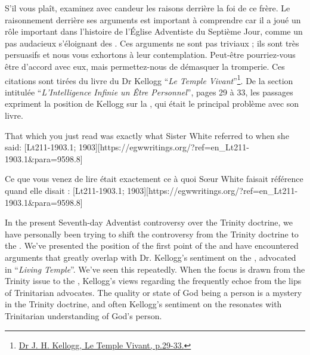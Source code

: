 S'il vous plaît, examinez avec candeur les raisons derrière la foi de ce frère. Le raisonnement derrière ses arguments est important à comprendre car il a joué un rôle important dans l'histoire de l'Église Adventiste du Septième Jour, comme un pas audacieux s'éloignant des . Ces arguments ne sont pas triviaux ; ils sont très persuasifs et nous vous exhortons à leur contemplation. Peut-être pourriez-vous être d'accord avec eux, mais permettez-nous de démasquer la tromperie. Ces citations sont tirées du livre du Dr Kellogg “\textit{Le Temple Vivant}”\footnote{\href{https://archive.org/details/J.H.Kellogg.TheLivingTemple1903}{Dr J. H. Kellogg, Le Temple Vivant, p.29-33.}}. De la section intitulée “\textit{L'Intelligence Infinie un Être Personnel}”, pages 29 à 33, les passages expriment la position de Kellogg sur la , qui était le principal problème avec son livre.


That which you just read was exactly what Sister White referred to when she said: [Lt211-1903.1; 1903][https://egwwritings.org/?ref=en\_Lt211-1903.1&para=9598.8]


Ce que vous venez de lire était exactement ce à quoi Sœur White faisait référence quand elle disait : [Lt211-1903.1; 1903][https://egwwritings.org/?ref=en\_Lt211-1903.1&para=9598.8]


In the present Seventh-day Adventist controversy over the Trinity doctrine, we have personally been trying to shift the controversy from the Trinity doctrine to the . We’ve presented the position of the first point of the  and have encountered arguments that greatly overlap with Dr. Kellogg’s sentiment on the , advocated in “\textit{Living Temple}”. We’ve seen this repeatedly. When the focus is drawn from the Trinity issue to the , Kellogg’s views regarding the  frequently echoe from the lips of Trinitarian advocates. The quality or state of God being a person is a mystery in the Trinity doctrine, and often Kellogg’s sentiment on the  resonates with Trinitarian understanding of God’s person.


